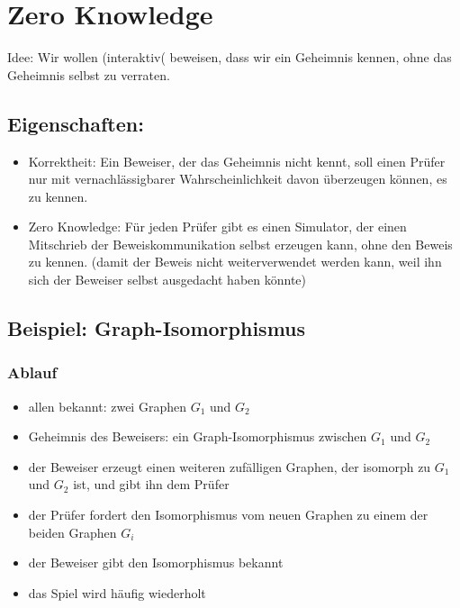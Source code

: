 \documentclass[a4paper,twoside,DIV15,BCOR12mm]{scrbook}
\begin{document}

\chapter{Zero Knowledge}

Idee: Wir wollen (interaktiv( beweisen, dass wir ein Geheimnis kennen, ohne das Geheimnis selbst zu verraten. 

\section{Eigenschaften:} 

\begin{itemize}
	\item Korrektheit: Ein Beweiser, der das Geheimnis nicht kennt, soll einen Prüfer nur mit vernachlässigbarer Wahrscheinlichkeit davon überzeugen können, es zu kennen.
	\item Zero Knowledge: Für jeden Prüfer gibt es einen Simulator, der einen Mitschrieb der Beweiskommunikation selbst erzeugen kann, ohne den Beweis zu kennen. (damit der Beweis nicht weiterverwendet werden kann, weil ihn sich der Beweiser selbst ausgedacht haben könnte)
\end{itemize}

\section{Beispiel: Graph-Isomorphismus}

\subsection{Ablauf}

\begin{itemize}
	\item allen bekannt: zwei Graphen $G_1$ und $G_2$
	\item Geheimnis des Beweisers: ein Graph-Isomorphismus zwischen $G_1$ und $G_2$
	\item der Beweiser erzeugt einen weiteren zufälligen Graphen, der isomorph zu $G_1$ und $G_2$ ist, und gibt ihn dem Prüfer
	\item der Prüfer fordert den Isomorphismus vom neuen Graphen zu einem der beiden Graphen $G_i$
	\item der Beweiser gibt den Isomorphismus bekannt
	\item das Spiel wird häufig wiederholt
\end{itemize}
\end{document}
